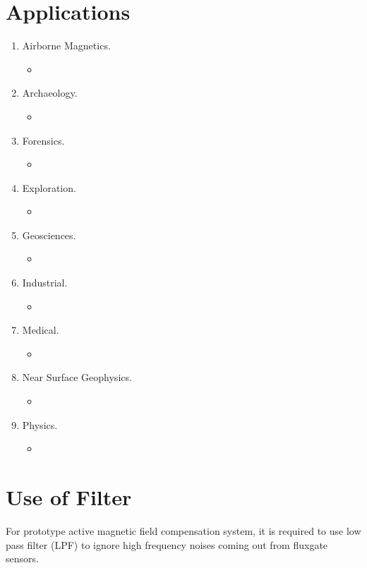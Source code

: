 \section{Applications}
\begin{enumerate}
   \item Airborne Magnetics.
   \begin{itemize}
     \item 
   \end{itemize}
   \item Archaeology.
   \begin{itemize}
     \item 
   \end{itemize}
   \item Forensics.
   \begin{itemize}
     \item 
   \end{itemize}
   \item Exploration.
   \begin{itemize}
     \item 
   \end{itemize}
   \item Geosciences.
   \begin{itemize}
     \item 
   \end{itemize}
   \item Industrial.
   \begin{itemize}
     \item 
   \end{itemize}
   \item Medical.
   \begin{itemize}
     \item 
   \end{itemize}
   \item Near Surface Geophysics.
   \begin{itemize}
     \item 
   \end{itemize}
   \item Physics.
   \begin{itemize}
     \item 
   \end{itemize}
\end{enumerate}




\section{Use of Filter}
For prototype active magnetic field compensation system, it is required to use low pass filter (LPF) to ignore high frequency noises coming out from fluxgate sensors.

